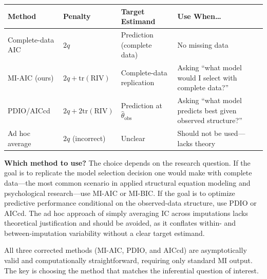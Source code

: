 \documentclass[
]{article}
\begin{document}
\begin{longtable}[]{@{}
  >{\raggedright\arraybackslash}p{}
  >{\raggedright\arraybackslash}p{}
  >{\raggedright\arraybackslash}p{}
  >{\raggedright\arraybackslash}p{}@{}}
\toprule\noalign{}
\begin{minipage}[b]{\linewidth}\raggedright
Method
\end{minipage} & \begin{minipage}[b]{\linewidth}\raggedright
Penalty
\end{minipage} & \begin{minipage}[b]{\linewidth}\raggedright
Target Estimand
\end{minipage} & \begin{minipage}[b]{\linewidth}\raggedright
Use When\ldots{}
\end{minipage} \\
\midrule\noalign{}
\endhead
\bottomrule\noalign{}
\endlastfoot
Complete-data AIC & \(2q\) & Prediction (complete data) & No missing
data \\
MI-AIC (ours) & \(2q + \text{tr}(\text{RIV})\) & Complete-data
replication & Asking ``what model would I select with complete
data?'' \\
PDIO/AICcd & \(2q + 2\text{tr}(\text{RIV})\) & Prediction at
\(\hat{\theta}_{\text{obs}}\) & Asking ``what model predicts best given
observed structure?'' \\
Ad hoc average & \(2q\) (incorrect) & Unclear & Should not be
used---lacks theory \\
\end{longtable}

\textbf{Which method to use?} The choice depends on the research
question. If the goal is to replicate the model selection decision one
would make with complete data---the most common scenario in applied
structural equation modeling and psychological research---use MI-AIC or
MI-BIC. If the goal is to optimize predictive performance conditional on
the observed-data structure, use PDIO or AICcd. The ad hoc approach of
simply averaging IC across imputations lacks theoretical justification
and should be avoided, as it conflates within- and between-imputation
variability without a clear target estimand.

All three corrected methods (MI-AIC, PDIO, and AICcd) are asymptotically
valid and computationally straightforward, requiring only standard MI
output. The key is choosing the method that matches the inferential
question of interest.
\end{document}
